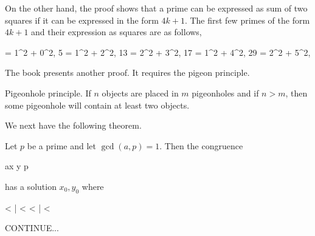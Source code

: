 On the other hand, the proof shows that a prime can be expressed as sum of two squares if it can be expressed in the form $4k+1$. The first few primes of the form $4k+1$ and their expression as squares are as follows,

 = 1^2 + 0^2, 5 = 1^2 + 2^2, 13 = 2^2 + 3^2, 17 = 1^2 + 4^2, 29 = 2^2 + 5^2, \cdots
\eee

The book presents another proof. It requires the pigeon principle.

\begin{theorem}
    Pigeonhole principle. If $n$ objects are placed in $m$ pigeonholes and if $n > m$, then some pigeonhole will contain at least two objects.
\end{theorem}

We next have the following theorem.

\begin{theorem}
    Let $p$ be a prime and let $\gcd(a,p)=1$. Then the congruence

    \bee
    ax \equiv y \mod p
    \eee

    has a solution $x_0, y_0$ where

     < |  <  \quad {}  < |  < 
    \eee

\end{theorem}

CONTINUE...


